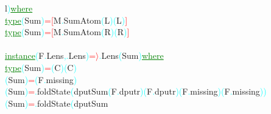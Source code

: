{\rm{}l}\textcolor{cyan}{)}\hsspace \textcolor{green}{\underline{where}}\\\hstab \textcolor{green}{\underline{type}}\hsspace \textcolor{cyan}{(}{\rm{}Sum}\textcolor{cyan}{)}\hsspace \textcolor{red}{=}\hsspace \textcolor{red}{[}{\rm{}M}\textcolor{cyan}{.}{\rm{}SumAtom}\hsspace \textcolor{cyan}{(}{\rm{}L}\textcolor{cyan}{)}\hsspace \textcolor{cyan}{(}{\rm{}L}\textcolor{cyan}{)}\textcolor{red}{]}\\\hstab \textcolor{green}{\underline{type}}\hsspace \textcolor{cyan}{(}{\rm{}Sum}\textcolor{cyan}{)}\hsspace \textcolor{red}{=}\hsspace \textcolor{red}{[}{\rm{}M}\textcolor{cyan}{.}{\rm{}SumAtom}\hsspace \textcolor{cyan}{(}{\rm{}R}\textcolor{cyan}{)}\hsspace \textcolor{cyan}{(}{\rm{}R}\textcolor{cyan}{)}\textcolor{red}{]}\\\\\textcolor{green}{\underline{instance}}\hsspace \textcolor{cyan}{(}{\rm{}F}\textcolor{cyan}{.}{\rm{}Lens}\textcolor{cyan}{,}\textcolor{cyan}{.}{\rm{}Lens}\textcolor{cyan}{)}\hsspace \textcolor{red}{=\ensuremath{\rangle}}\textcolor{cyan}{.}{\rm{}Lens}\hsspace \textcolor{cyan}{(}{\rm{}Sum}\textcolor{cyan}{)}\hsspace \textcolor{green}{\underline{where}}\\\hstab \textcolor{green}{\underline{type}}\hsspace \hsspace \textcolor{cyan}{(}{\rm{}Sum}\textcolor{cyan}{)}\hsspace \textcolor{red}{=}\hsspace \textcolor{cyan}{(}{\rm{}C}\textcolor{cyan}{)}\hsspace \textcolor{cyan}{(}{\rm{}C}\textcolor{cyan}{)}\\\hsspace \textcolor{cyan}{(}{\rm{}Sum}\textcolor{cyan}{)}\hsspace \textcolor{red}{=}\hsspace \textcolor{cyan}{(}{\rm{}F}\textcolor{cyan}{.}{\rm{}missing}\textcolor{cyan}{)}\\\hsspace \hsspace \hsspace \textcolor{cyan}{(}{\rm{}Sum}\textcolor{cyan}{)}\hsspace \textcolor{red}{=}\textcolor{cyan}{.}{\rm{}foldState}\hsspace \textcolor{cyan}{(}{\rm{}dputSum}\hsspace \textcolor{cyan}{(}{\rm{}F}\textcolor{cyan}{.}{\rm{}dputr}\textcolor{cyan}{)}\hsspace \textcolor{cyan}{(}{\rm{}F}\textcolor{cyan}{.}{\rm{}dputr}\textcolor{cyan}{)}\hsspace \textcolor{cyan}{(}{\rm{}F}\textcolor{cyan}{.}{\rm{}missing}\textcolor{cyan}{)}\hsspace \textcolor{cyan}{(}{\rm{}F}\textcolor{cyan}{.}{\rm{}missing}\textcolor{cyan}{)}\textcolor{cyan}{)}\\\hsspace \hsspace \hsspace \textcolor{cyan}{(}{\rm{}Sum}\textcolor{cyan}{)}\hsspace \textcolor{red}{=}\textcolor{cyan}{.}{\rm{}foldState}\hsspace \textcolor{cyan}{(}{\rm{}dputSum}\hsspace 